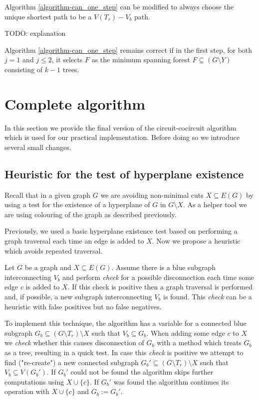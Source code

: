 \begin{cor}
	Algorithm \ref{algorithm-can_one_step} can be modified to always choose the unique shortest path to be a $V(T_r){-}V_b$ path.
\end{cor}

TODO: explanation

\begin{claim}
	\label{forest_sel_claim}
	Algorithm \ref{algorithm-can_one_step} remains correct if in the first step, for both $j = 1$ and $j \leq 2$, it selects $F$ as the minimum spanning forest ${F \subseteq (G \setminus Y)}$ consisting of $k-1$ trees.
\end{claim}

\section{Complete algorithm}

In this section we provide the final version of the circuit-cocircuit algorithm which is used for our practical implementation. Before doing so we introduce several small changes.


\subsection*{Heuristic for the test of hyperplane existence}
Recall that in a given graph $G$ we are avoiding non-minimal cuts $X \subseteq E(G)$ by using a test for the existence of a hyperplane of $G$ in $G \setminus X$. As a helper tool we are using colouring of the graph as described previously.

Previously, we used a basic hyperplane existence test based on performing a graph traversal each time an edge is added to $X$. Now we propose a heuristic which avoids repeated traversal.

\begin{claim}
	Let $G$ be a graph and $X \subseteq E(G)$. Assume there is a blue subgraph interconnecting $V_b$ and perform \textit{check} for a possible disconnection each time some edge $c$ is added to $X$. If this check is positive then a graph traversal is performed and, if possible, a new subgraph interconnecting $V_b$ is found. This \textit{check} can be a heuristic with false positives but no false negatives.
\end{claim}

To implement this technique, the algorithm has a variable for a connected blue subgraph $G_b \subseteq (G \setminus T_r) \setminus X$ such that $V_b \subseteq G_b$. When adding some edge $c$ to $X$ we \textit{check} whether this causes disconnection of $G_b$ with a method which treats $G_b$ as a tree, resulting in a quick test. In case this \textit{check} is positive we attempt to find ("re-create") a new connected subgraph $G_b' \subseteq (G \setminus T_r) \setminus X$ such that $V_b \subseteq V(G_b')$. If $G_b'$ could not be found the algorithm skips further computations using $X \cup \{c\}$. If $G_b'$ was found the algorithm continues its operation with $X \cup \{c\}$ and $G_b := G_b'$.

